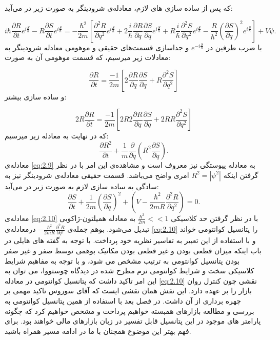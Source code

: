 \documentclass[a4paper,titlepage,12pt,fleqn,oneside]{report}
\begin{document}
	که پس از ساده سازی های لازم، معادله‌ی شرودینگر به صورت زیر در می‌آید:
	
	\begin{equation}
		i\hbar\frac{\partial R}{\partial t}e^{i \frac{S}{\hbar}}-R\frac{\partial S}{\partial t}e^{i \frac{S}{\hbar}} =-\frac{\hbar^2}{2m}\left[\frac{\partial^2 R}{\partial q^2} e^{i\frac{S}{h}}+2\frac{i}{\hbar}\frac{\partial R}{\partial q}\frac{\partial S}{\partial q} e^{i\frac{S}{h}}+R\frac{i}{\hbar}\frac{\partial^2 S}{\partial q^2} e^{i\frac{S}{h}}-\frac{R}{\hbar^2}\left(\frac{\partial S}{\partial q}\right)^2 e^{i\frac{S}{h}}
		\right]+V\psi.
	\end{equation}
	با ضرب طرفین در $e^{-i\frac{S}{h}}$ و  جداسازی قسمت‌های حقیقی و موهومی معادله شرودینگر به معادلات زیر میرسیم، که قسمت موهومی آن به صورت:
	
	\begin{equation}
		\frac{\partial R}{\partial t} = \frac{-1}{2m} \left[2\frac{\partial R}{\partial q}\frac{\partial S}{\partial q}+R\frac{\partial^2 S}{\partial q^2}
		\right]
	\end{equation}
	و ساده سازی بیشتر:
	
	\begin{equation}
		2R\frac{\partial R}{\partial t} = \frac{-1}{2m} \left[2R2\frac{\partial R}{\partial q}\frac{\partial S}{\partial q}+2RR\frac{\partial^2 S}{\partial q^2}
		\right]
	\end{equation}
	که در نهایت به معادله زیر میرسیم:
	\begin{equation}
		\frac{\partial R^2}{\partial t} + \frac{1}{m}\frac{\partial}{\partial q}\left(R^2\frac{\partial S}{\partial q}\right).
		\label{eq:2.9} 
	\end{equation} 
	معادله‌ی 
	\ref{eq:2.9}
	به معادله پیوستگی نیز  معروف است و مشاهده‌ی این امر با در نظر گرفتن اینکه $R^2=|\psi^2|$ امری واضح می‌باشد. 
	قسمت حقیقی معادله‌ی شرودینگر نیز به سادگی به ساده سازی لازم به صورت زیر در می‌آید:
	\begin{equation}
		\frac{\partial S}{\partial t} + \frac{1}{2m} \left(\frac{\partial S}{\partial q}\right)^2+
		\left(V-\frac{\hbar^2}{2mR} \frac{\partial^2 R}{\partial q^2}\right)=0.
		\label{eq:2.10}
	\end{equation}
	معادله‌ی 
	\ref{eq:2.10}
	با در نظر گرفتن حد کلاسیکی 
	$\frac{\hbar^2}{2m} <<1$
	به معادله همیلتون-ژاکوبی تبدیل می‌شود. بوهم جمله‌ی 
	$-\frac{\hbar^2}{2mR} \frac{\partial^2 R}{\partial q^2}$
	درمعادله‌ی 
	\ref{eq:2.10}
	را پتانسیل کوانتومی خواند و با استفاده از این تعبیر به تفاسیر نظریه خود پرداخت.  با توجه به گفته های هایلی در باب اینکه میزان قطعی بودن و غیر قطعی بودن مکانیک بوهمی توسط صفر و غیر صفر بودن پتانسیل کوانتومی به ترتیب مشخص می شود، و با توجه به مفاهیم شرایط کلاسیکی سخت و شرایط کوانتومی نرم مطرح شده در دیدگاه چوستووا، می توان به این امر تاکید داشت که پتانسیل کوانتومی در معادله \ref{eq:2.10} نقشی چون کنترل روان بازار را بر عهده دارد. این نقش همان نقشی ایست که آقای سوروس تاکید مهمی بر چهره برداری از آن داشت. در فصل بعد با استفاده از همین پتانسیل کوانتومی به بررسی و مطالعه بازارهای همبسته خواهیم پرداخت و مشخص خواهیم کرد که چگونه پارامتر های موجود در این پتانسیل قابل تفسیر در زبان بازارهای مالی خواهند بود. برای فهم بهتر این موضوع همچنان با ما در ادامه مسیر همراه باشید.
	
\end{document}
